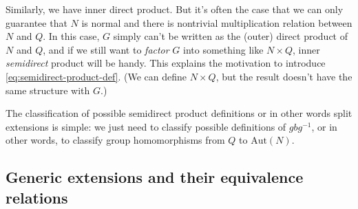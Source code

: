 \documentclass[hyperref, a4paper]{article}
\begin{document}
Similarly, we have inner direct product. But it's often the case that we can only guarantee that $N$ is normal 
and there is nontrivial multiplication relation between $N$ and $Q$. In this case, $G$ simply can't be 
written as the (outer) direct product of $N$ and $Q$, and if we still want to \emph{factor} $G$ into 
something like $N \times Q$, inner \emph{semidirect} product will be handy. This explains the motivation
to introduce \eqref{eq:semidirect-product-def}. (We can define $N \times Q$, but the result doesn't have 
the same structure with $G$.)

The classification of possible semidirect product definitions or in other words split extensions is simple:
we just need to classify possible definitions of $g b g^{-1}$, or in other words, to classify group homomorphisms
from $Q$ to $\mathrm{Aut}(N)$.

\subsection{Generic extensions and their equivalence relations}
\end{document}
